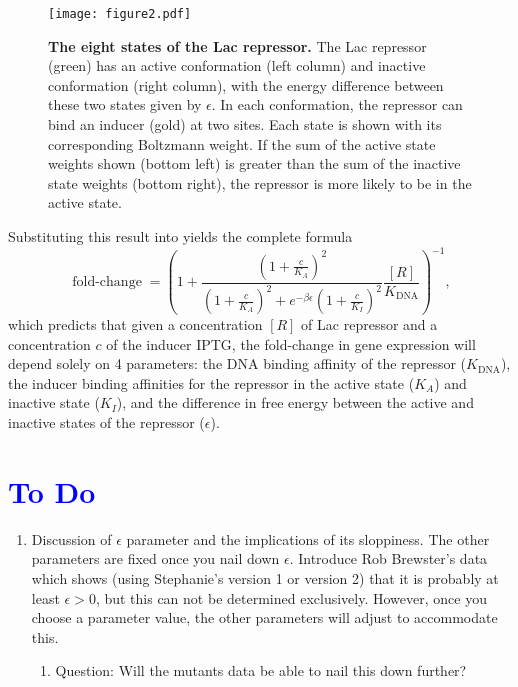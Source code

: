 \documentclass[10pt,letterpaper]{article}
\newcommand \foldchange{\operatorname{fold-change}}
\newcommand\globalScalePlots{1}
\newcommand{\K}{K_{\text{DNA}}}
\begin{document}
\begin{figure}[h]
	\centering \texttt{[image: figure2.pdf]}
	\caption{{\bf The eight states of the Lac repressor.} The Lac repressor (green)
		has an active conformation (left column) and inactive conformation (right
		column), with the energy difference between these two states given by
		$\epsilon$. In each conformation, the repressor can bind an inducer (gold) at
		two sites. Each state is shown with its corresponding Boltzmann weight. If the
		sum of the active state weights shown (bottom left) is greater than the sum of
		the inactive state weights (bottom right), the repressor is more likely to be
		in the active state.} \label{figrepressorInducerStates}
\end{figure}

Substituting this result into \eref[eq5] yields the complete formula
\begin{equation}\label{eq7}
\foldchange= \left(
1+\frac{\left(1+\frac{c}{K_A}\right)^2}{\left(1+\frac{c}{K_A}\right)^2+e^{-\beta
		\epsilon }\left(1+\frac{c}{K_I}\right)^2}\frac{[R]}{\K} \right)^{-1},
\end{equation}
which predicts that given a concentration \([R]\) of Lac repressor and a
concentration \(c\) of the inducer IPTG, the fold-change in gene expression will
depend solely on 4 parameters: the DNA binding affinity of the repressor
(\(\K\)), the inducer binding affinities for the repressor in the active state
(\(K_A\)) and inactive state (\(K_I\)), and the difference in free energy
between the active and inactive states of the repressor (\(\epsilon\)).

\section*{\textcolor{blue}{To Do}}

\begin{enumerate}
	\item Discussion of $\epsilon$ parameter and the implications of its sloppiness. The other parameters are fixed once you nail down $\epsilon$. Introduce Rob Brewster's data  which shows (using Stephanie's version 1 or version 2) that it is probably at least $\epsilon > 0$, but this can not be determined exclusively. However, once you choose a parameter value, the other parameters will adjust to accommodate this.
	\begin{enumerate}
		\item Question: Will the mutants data be able to nail this down further?
	\end{enumerate}
\end{enumerate}

\nolinenumbers



\end{document}
